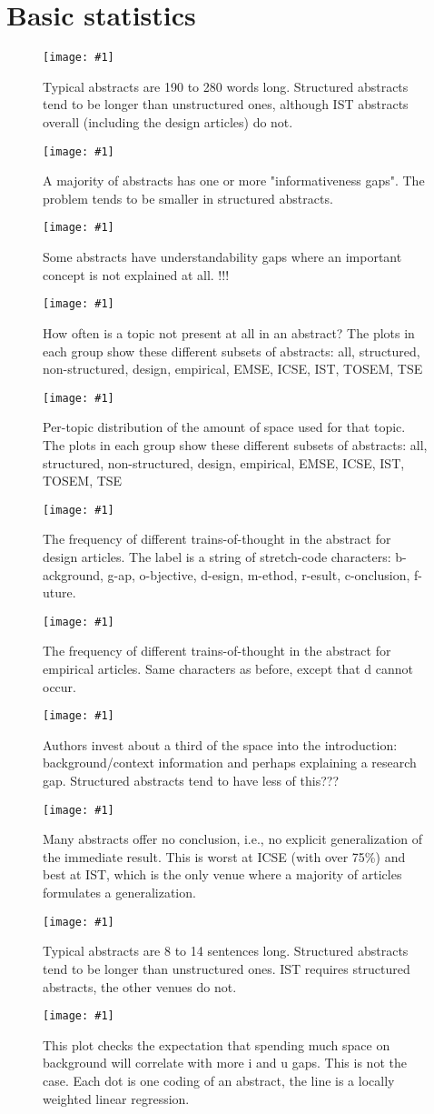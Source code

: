 \documentclass[10pt,journal,compsoc]{IEEEtran}
\newcommand{\Plot}[2]{%
	\begin{figure}[!t]%
		\centering\texttt{[image: \#1]}%
		\vspace{-4mm}\caption{#2}\label{#1}%
	\end{figure}}
\newcommand{\Plotwide}[2]{%
	\begin{figure*}%
		\centering\texttt{[image: \#1]}%
		\vspace{-4mm}\caption{#2}\label{#1}%
    \end{figure*}}
\begin{document}
\appendix
\section{Basic statistics}

\Plot{boxplots_words}{%
  Typical abstracts are 190 to 280 words long. 
  Structured abstracts tend to be longer than unstructured ones, 
  although IST abstracts overall (including the design articles) do not.}
\Plot{boxplots_icount}{%
  A majority of abstracts has one or more "informativeness gaps".
  The problem tends to be smaller in structured abstracts.}
\Plot{boxplots_ucount}{%
  Some abstracts have understandability gaps where an important concept is not explained at all.
  !!!}
\Plotwide{zerofractionbar_xletgroups_topicmissingfractions}{%
	How often is a topic not present at all in an abstract?
	The plots in each group show these different subsets of abstracts:
	all, structured, non-structured, design, empirical, EMSE, ICSE, IST, TOSEM, TSE}
\Plotwide{box_xletgroups_topicfractions}{%
	Per-topic distribution of the amount of space used for that topic.
	The plots in each group show these different subsets of abstracts:
	all, structured, non-structured, design, empirical, EMSE, ICSE, IST, TOSEM, TSE}
\Plot{ab_topicstructure_freqs_design}{%
  The frequency of different trains-of-thought in the abstract for design articles.
  The label is a string of stretch-code characters:
  b-ackground, g-ap, o-bjective, d-esign, m-ethod, r-esult, c-onclusion, f-uture.}
\Plot{ab_topicstructure_freqs_empir}{%
	The frequency of different trains-of-thought in the abstract for empirical articles.
	Same characters as before, except that d cannot occur.}
\Plot{boxplots_fraction_introduction}{%
	Authors invest about a third of the space into the introduction:
	background/context information and perhaps explaining a research gap.
	Structured abstracts tend to have less of this???}
\Plot{boxplots_fraction_conclusion}{%
	Many abstracts offer no conclusion, i.e., no explicit generalization of the immediate result.
	This is worst at ICSE (with over 75\%)
	and best at IST, which is the only venue where a majority of articles formulates a generalization.}
\Plot{boxplots_sentences}{%
	Typical abstracts are 8 to 14 sentences long.
	Structured abstracts tend to be longer than unstructured ones.
	IST requires structured abstracts, the other venues do not.}
\Plot{lowess_gaps_by_fracintro}{%
	This plot checks the expectation that spending much space on background
	will correlate with more i and u gaps.
	This is not the case.
	Each dot is one coding of an abstract, 
	the line is a locally weighted linear regression.}
\end{document}
